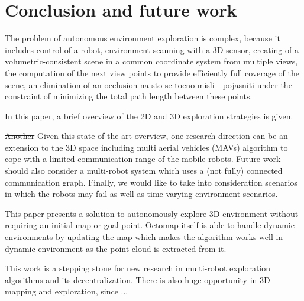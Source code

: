 \section{Conclusion and future work} \label{sec:conclusion}

The problem of autonomous environment exploration is complex, because it includes  control of a robot, environment scanning with a 3D sensor, creating of a volumetric-consistent scene in a common coordinate system from multiple views, the computation of the next view points to provide efficiently full coverage of the scene, {\color{green}an elimination of an occlusion na sto se tocno misli - pojasniti} under the constraint of minimizing the total path length between these points. 

In this paper, a brief overview of the 2D and 3D exploration strategies is given. 

\st{Another} {\color{red}Given this state-of-the art overview, one} research direction can be an extension to the 3D space including multi aerial vehicles (MAVs) algorithm to cope with a limited communication range of the mobile robots. Future work should also consider a multi-robot system which uses a (not fully) connected communication graph. Finally, we would like to take into consideration scenarios in which the robots may fail as well as time-varying environment scenarios.

This paper presents a solution to autonomously explore 3D environment without requiring an initial map or goal point. Octomap itself is able to handle dynamic environments by updating the map which makes the algorithm works well in dynamic environment as the point cloud is extracted from it.

This work is a stepping stone for new research in multi-robot exploration algorithms and its decentralization. There is also huge opportunity in 3D mapping and exploration, since ...